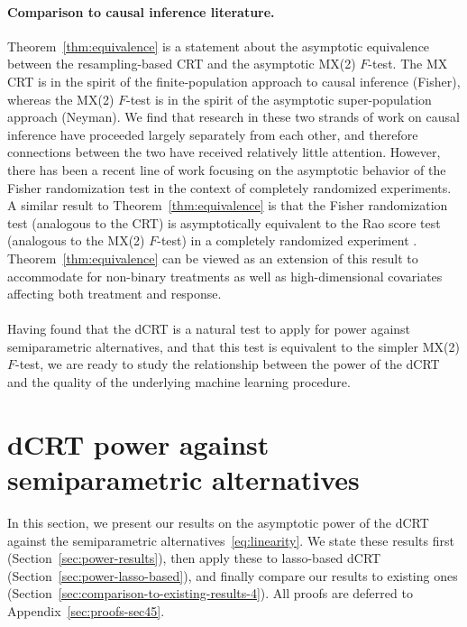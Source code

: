 \documentclass[ejs]{imsart}
\numberwithin{equation}{section}
\theoremstyle{plain}
\theoremstyle{definition}
\theoremstyle{remark}
\begin{document}
\paragraph{Comparison to causal inference literature.}

Theorem~\ref{thm:equivalence} is a statement about the asymptotic equivalence between the resampling-based CRT and the asymptotic MX(2) $F$-test. The MX CRT is in the spirit of the finite-population approach to causal inference (Fisher), whereas the MX(2) $F$-test is in the spirit of the asymptotic super-population approach (Neyman). We find that research in these two strands of work on causal inference have proceeded largely separately from each other, and therefore connections between the two have received relatively little attention. However, there has been a recent line of work \citep{Ding2017,Wu2020a,Zhao2021} focusing on the asymptotic behavior of the Fisher randomization test in the context of completely randomized experiments. A similar result to Theorem~\ref{thm:equivalence} is that the Fisher randomization test (analogous to the CRT) is asymptotically equivalent to the Rao score test (analogous to the MX(2) $F$-test) in a completely randomized experiment \citep[Theorem A.1]{Ding2017}. Theorem~\ref{thm:equivalence} can be viewed as an extension of this result to accommodate for non-binary treatments as well as high-dimensional covariates affecting both treatment and response.



\paragraph{}

Having found that the dCRT is a natural test to apply for power against semiparametric alternatives, and that this test is equivalent to the simpler MX(2) $F$-test, we are ready to study the relationship between the power of the dCRT and the quality of the underlying machine learning procedure.

\section{dCRT power against semiparametric alternatives} \label{sec:asymptotic-power}

In this section, we present our results on the asymptotic power of the dCRT against the semiparametric alternatives~\eqref{eq:linearity}. We state these results first (Section~\ref{sec:power-results}), then apply these to lasso-based dCRT (Section~\ref{sec:power-lasso-based}), and finally compare our results to existing ones (Section~\ref{sec:comparison-to-existing-results-4}). All proofs are deferred to Appendix~\ref{sec:proofs-sec45}.
\end{document}

